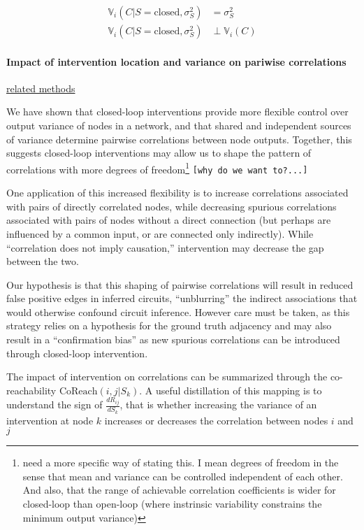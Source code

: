 \[
\begin{aligned}
\mathbb{V}_{i}(C|S=\text{closed},\sigma^2_S) &= \sigma^2_S  \\
\mathbb{V}_{i}(C|S=\text{closed},\sigma^2_S) &\perp \mathbb{V}_{i}(C)
\end{aligned}
\]

\hypertarget{impact-of-intervention-location-and-variance-on-pariwise-correlations}{%
\paragraph{Impact of intervention location and variance on pariwise
correlations}\label{impact-of-intervention-location-and-variance-on-pariwise-correlations}}

\href{methods1_predicting_correlation.md}{related methods}

We have shown that closed-loop interventions provide more flexible
control over output variance of nodes in a network, and that shared and
independent sources of variance determine pairwise correlations between
node outputs. Together, this suggests closed-loop interventions may
allow us to shape the pattern of correlations with more degrees of
freedom\footnote{need a more specific way of stating this. I mean
  degrees of freedom in the sense that mean and variance can be
  controlled independent of each other. And also, that the range of
  achievable correlation coefficients is wider for closed-loop than
  open-loop (where instrinsic variability constrains the minimum output
  variance)} \texttt{{[}why\ do\ we\ want\ to?...{]}}

One application of this increased flexibility is to increase
correlations associated with pairs of directly correlated nodes, while
decreasing spurious correlations associated with pairs of nodes without
a direct connection (but perhaps are influenced by a common input, or
are connected only indirectly). While ``correlation does not imply
causation,'' intervention may decrease the gap between the two.

Our hypothesis is that this shaping of pairwise correlations will result
in reduced false positive edges in inferred circuits, ``unblurring'' the
indirect associations that would otherwise confound circuit inference.
However care must be taken, as this strategy relies on a hypothesis for
the ground truth adjacency and may also result in a ``confirmation
bias'' as new spurious correlations can be introduced through
closed-loop intervention.

The impact of intervention on correlations can be summarized through the
co-reachability \(\text{CoReach}(i,j|S_k)\). A useful distillation of
this mapping is to understand the sign of \(\frac{dR_{ij}}{dS_k}\), that
is whether increasing the variance of an intervention at node \(k\)
increases or decreases the correlation between nodes \(i\) and \(j\)

